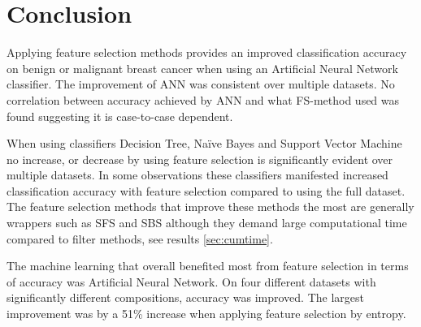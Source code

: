 \chapter{Conclusion}




Applying feature selection methods provides an improved classification accuracy on benign or malignant breast cancer when using an Artificial Neural Network classifier. The improvement of ANN was consistent over multiple datasets. No correlation between accuracy achieved by ANN and what FS-method used was found suggesting it is case-to-case dependent.

When using classifiers Decision Tree, Na\"ive Bayes and Support Vector Machine no increase, or decrease by using feature selection is significantly evident over multiple datasets. In some observations these classifiers manifested increased classification accuracy with feature selection compared to using the full dataset. The feature selection methods that improve these methods the most are generally wrappers such as SFS and SBS although they demand large computational time compared to filter methods, see results \ref{sec:cumtime}.


The machine learning that overall benefited most from feature selection in terms of accuracy was Artificial Neural Network. On four different datasets with significantly different compositions, accuracy was improved. The largest improvement was by a 51\% increase when applying feature selection by entropy.

